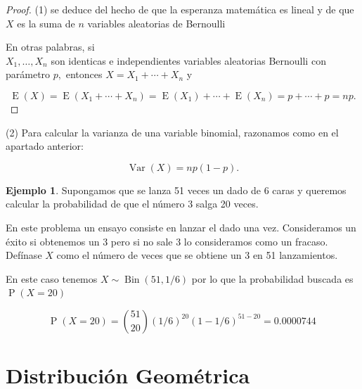 \documentclass[]{book}
\theoremstyle{plain}
\theoremstyle{definition}
\newtheorem{example}[theorem]{Ejemplo}
\theoremstyle{definition} %
\begin{document}
\begin{proof}
  
(1) se deduce del hecho de que la esperanza matemática es lineal y de
que \(X\) es la suma de \(n\) variables aleatorias de Bernoulli

En otras palabras, si\\
\(\displaystyle X_{1},\ldots ,X_{n}\) son identicas e independientes
variables aleatorias Bernoulli con parámetro \(p,\) entonces
\(\displaystyle X=X_{1}+\cdots +X_{n}\) y

\[\displaystyle \operatorname {E} (X)=\operatorname {E} (X_{1}+\cdots +X_{n})=\operatorname {E} (X_{1})+\cdots +\operatorname {E} (X_{n})=p+\cdots +p=np.\]

\end{proof}
 
(2) Para calcular la varianza de una variable binomial, razonamos como en el
apartado anterior:

\[\displaystyle \operatorname {Var} (X)=np(1-p).\]
 

\begin{example}
  
Supongamos que se lanza 51 veces un dado de 6 caras y queremos calcular
la probabilidad de que el número 3 salga 20 veces.

En este problema un ensayo consiste en lanzar el dado una vez.
Consideramos un éxito si obtenemos un 3 pero si no sale 3 lo
consideramos como un fracaso. Defínase \(X\) como el número de veces que
se obtiene un 3 en 51 lanzamientos.

En este caso tenemos
\(\displaystyle X\sim \operatorname {Bin} (51,1/6)\) por lo que la
probabilidad buscada es \(\displaystyle \operatorname {P} (X=20)\)

\[\displaystyle \operatorname {P} (X=20)={51 \choose 20}(1/6)^{20}(1-1/6)^{51-20}=0.0000744\,\!\]

\end{example}
 
\section{Distribución Geométrica} 
\end{document}
